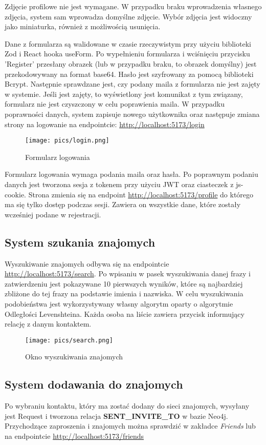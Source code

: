 \documentclass{article}
\begin{document}
Zdjęcie profilowe nie jest wymagane. W przypadku braku wprowadzenia własnego zdjęcia, system sam wprowadza domyślne zdjęcie. Wybór zdjęcia jest widoczny jako miniaturka, również z możliwością usunięcia.

Dane z formularza są walidowane w czasie rzeczywistym przy użyciu biblioteki Zod i React hooka useForm. Po wypełnieniu formularza i wciśnięciu przycisku 'Register' przesłany obrazek (lub w przypadku braku, to obrazek domyślny) jest przekodowywany na format base64. Hasło jest szyfrowany za pomocą biblioteki Bcrypt. Następnie sprawdzane jest, czy podany maila z formularza nie jest zajęty w systemie. Jeśli jest zajęty, to wyświetlony jest komunikat z tym związany, formularz nie jest czyszczony w celu poprawienia maila. W przypadku poprawności danych, system zapisuje nowego użytkownika oraz następuje zmiana strony na logowanie na endpointcie:
\url{http://localhost:5173/login}

\begin{figure}[h]
    \centering
    \texttt{[image: pics/login.png]}
    \caption*{Formularz logowania}
\end{figure}

Formularz logowania wymaga podania maila oraz hasła. Po poprawnym podaniu danych jest tworzona sesja z tokenem przy użyciu JWT oraz ciasteczek z js-cookie. Strona zmienia się na endpoint
\url{http://localhost:5173/profile} do którego ma się tylko dostęp podczas sesji. Zawiera on wszystkie dane, które zostały wcześniej podane w rejestracji.

\newpage
\subsection{System szukania znajomych}
Wyszukiwanie znajomych odbywa się na endpointcie \url{http://localhost:5173/search}. Po wpisaniu w pasek wyszukiwania danej frazy i zatwierdzeniu jest pokazywane 10 pierwszych wyników, które są najbardziej zbliżone do tej frazy na podstawie imienia i nazwiska. W celu wyszukiwania podobieństwa jest wykorzystywany własny algorytm oparty o algorytmie Odległości Levenshteina. Każda osoba na liście zawiera przycisk informujący relację z danym kontaktem.

\begin{figure}[h]
    \centering
    \texttt{[image: pics/search.png]}
    \caption*{Okno wyszukiwania znajomych}
\end{figure}

\newpage
\subsection{System dodawania do znajomych}
Po wybraniu kontaktu, który ma zostać dodany do sieci znajomych, wysyłany jest Request i tworzona relacja \textbf{SENT\_INVITE\_TO} w bazie Neo4j. Przychodzące zaproszenia i znajomych można sprawdzić w zakładce \textit{Friends} lub na endpointcie \url{http://localhost:5173/friends}
\end{document}

